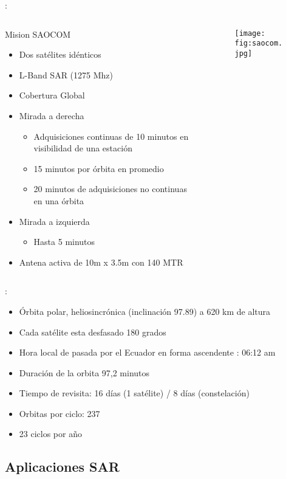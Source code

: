 \begin{frame}{\secname : \subsecname}
  \begin{columns}
    \begin{column}{0.6\textwidth}
     \begin{block}{Mision SAOCOM}
\begin{itemize}
  \item Dos satélites idénticos
  \item L-Band SAR (1275 Mhz)
  \item Cobertura Global
  \item Mirada a derecha
  \begin{itemize}
    \item Adquisiciones continuas de 10 minutos en visibilidad de una estación
    \item 15 minutos por órbita en promedio
    \item 20 minutos de adquisiciones no continuas en una órbita
  \end{itemize}
  \item Mirada a izquierda
  \begin{itemize}
    \item Hasta 5 minutos
  \end{itemize}
  \item Antena activa de 10m x 3.5m con 140 MTR
\end{itemize}
     \end{block}
    \end{column}
    \begin{column}{0.4\textwidth}  %
      \begin{figure}
        \centering
        \texttt{[image: fig:saocom.jpg]}
        \caption*{}
        \label{}
      \end{figure}
    \end{column}
    \end{columns}

\end{frame}

\begin{frame}{\secname : \subsecname}
\begin{itemize}
  \item Órbita polar, heliosincrónica (inclinación 97.89) a 620 km de altura
  \item Cada satélite esta desfasado 180 grados
  \item Hora local de pasada por el Ecuador en forma ascendente : 06:12 am
  \item Duración de la orbita 97,2 minutos
  \item Tiempo de revisita: 16 días (1 satélite) / 8 días (constelación)
  \item Orbitas por ciclo: 237
  \item 23 ciclos por año
\end{itemize}
\end{frame}

\subsection{Aplicaciones SAR}
